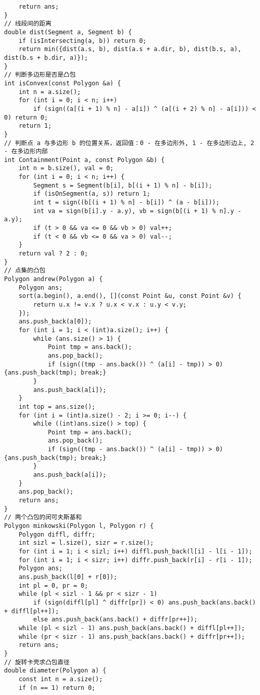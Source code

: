 \begin{verbatim}
    return ans;
}
// 线段间的距离
double dist(Segment a, Segment b) {
    if (isIntersecting(a, b)) return 0;
    return min({dist(a.s, b), dist(a.s + a.dir, b), dist(b.s, a), dist(b.s + b.dir, a)});
}
// 判断多边形是否是凸包
int isConvex(const Polygon &a) {
    int n = a.size();
    for (int i = 0; i < n; i++)
        if (sign((a[(i + 1) % n] - a[i]) ^ (a[(i + 2) % n] - a[i])) < 0) return 0;
    return 1;
}
// 判断点 a 与多边形 b 的位置关系，返回值：0 - 在多边形外, 1 - 在多边形边上, 2 - 在多边形内部
int Containment(Point a, const Polygon &b) {
    int n = b.size(), val = 0;
    for (int i = 0; i < n; i++) {
        Segment s = Segment(b[i], b[(i + 1) % n] - b[i]);
        if (isOnSegment(a, s)) return 1;
        int t = sign((b[(i + 1) % n] - b[i]) ^ (a - b[i]));
        int va = sign(b[i].y - a.y), vb = sign(b[(i + 1) % n].y - a.y);
        if (t > 0 && va <= 0 && vb > 0) val++;
        if (t < 0 && vb <= 0 && va > 0) val--;
    }
    return val ? 2 : 0;
}
// 点集的凸包
Polygon andrew(Polygon a) {
    Polygon ans;
    sort(a.begin(), a.end(), [](const Point &u, const Point &v) {
        return u.x != v.x ? u.x < v.x : u.y < v.y;
    });
    ans.push_back(a[0]);
    for (int i = 1; i < (int)a.size(); i++) {
        while (ans.size() > 1) {
            Point tmp = ans.back();
            ans.pop_back();
            if (sign((tmp - ans.back()) ^ (a[i] - tmp)) > 0) {ans.push_back(tmp); break;}
        }
        ans.push_back(a[i]);
    }
    int top = ans.size();
    for (int i = (int)a.size() - 2; i >= 0; i--) {
        while ((int)ans.size() > top) {
            Point tmp = ans.back();
            ans.pop_back();
            if (sign((tmp - ans.back()) ^ (a[i] - tmp)) > 0) {ans.push_back(tmp); break;}
        }
        ans.push_back(a[i]);
    }
    ans.pop_back();
    return ans;
}
// 两个凸包的闵可夫斯基和
Polygon minkowski(Polygon l, Polygon r) {
    Polygon diffl, diffr;
    int sizl = l.size(), sizr = r.size();
    for (int i = 1; i < sizl; i++) diffl.push_back(l[i] - l[i - 1]);
    for (int i = 1; i < sizr; i++) diffr.push_back(r[i] - r[i - 1]);
    Polygon ans;
    ans.push_back(l[0] + r[0]);
    int pl = 0, pr = 0;
    while (pl < sizl - 1 && pr < sizr - 1)
        if (sign(diffl[pl] ^ diffr[pr]) < 0) ans.push_back(ans.back() + diffl[pl++]);
        else ans.push_back(ans.back() + diffr[pr++]);
    while (pl < sizl - 1) ans.push_back(ans.back() + diffl[pl++]);
    while (pr < sizr - 1) ans.push_back(ans.back() + diffr[pr++]);
    return ans;
}
// 旋转卡壳求凸包直径
double diameter(Polygon a) {
    const int n = a.size();
    if (n == 1) return 0;

\end{verbatim}

